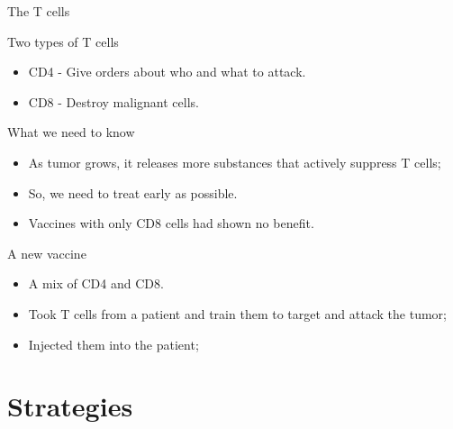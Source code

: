 \documentclass[dvips,11pt,xcolor=dvipsnames]{beamer}
\numberwithin{table}{section}
\numberwithin{figure}{section} %
\begin{document}
\begin{frame}{The T cells}
 \begin{exampleblock}{Two types of T cells}
    \begin{itemize}
    \item CD4 - Give orders about who and what to attack.
      \item CD8 - Destroy malignant cells.
    \end{itemize}
  \end{exampleblock}

\pause \begin{block}{What we need to know}
    \begin{itemize}
    \item As tumor  grows, it releases more substances  that actively suppress T
      cells;
    \item So, we need to treat early as possible.
    \item Vaccines with only CD8 cells had shown no benefit.
    \end{itemize}
  \end{block}

\pause \begin{alertblock}{A new vaccine}
    \begin{itemize}
    \item A mix of CD4 and CD8.
    \item Took T  cells from a patient  and train them to target  and attack the
      tumor;
    \item Injected them into the patient;
    \end{itemize}
  \end{alertblock}
\end{frame}



\section{Strategies}
\end{document}
